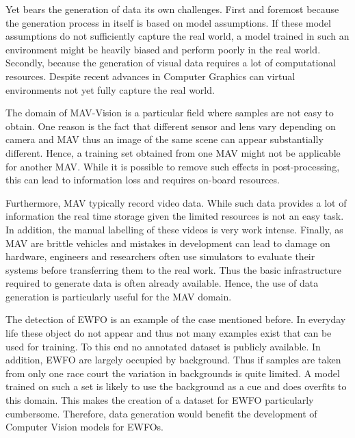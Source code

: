 Yet bears the generation of data its own challenges. First and foremost because the generation process in itself is based on model assumptions. If these model assumptions do not sufficiently capture the real world, a model trained in such an environment might be heavily biased and perform poorly in the real world. Secondly, because the generation of visual data requires a lot of computational resources. Despite recent advances in Computer Graphics can virtual environments not yet fully capture the real world.

The domain of \ac{MAV}-Vision is a particular field where samples are not easy to obtain. One reason is the fact that different sensor and lens vary depending on camera and \ac{MAV} thus an image of the same scene can appear substantially different. Hence, a training set obtained from one \ac{MAV} might not be applicable for another \ac{MAV}. While it is possible to remove such effects in post-processing, this can lead to information loss and requires on-board resources.

Furthermore, \ac{MAV} typically record video data. While such data provides a lot of information the real time storage given the limited resources is not an easy task. In addition, the manual labelling of these videos is very work intense. Finally, as \ac{MAV} are brittle vehicles and mistakes in development can lead to damage on hardware, engineers and researchers often use simulators to evaluate their systems before transferring them to the real work. Thus the basic infrastructure required to generate data is often already available. Hence, the use of data generation is particularly useful for the \ac{MAV} domain.

The detection of \ac{EWFO} is an example of the case mentioned before. In everyday life these object do not appear and thus not many examples exist that can be used for training. To this end no annotated dataset is publicly available. In addition, \ac{EWFO} are largely occupied by background. Thus if samples are taken from only one race court the variation in backgrounds is quite limited. A model trained on such a set is likely to use the background as a cue and does overfits to this domain. This makes the creation of a dataset for \ac{EWFO} particularly cumbersome. Therefore, data generation would benefit the development of Computer Vision models for \acp{EWFO}.

